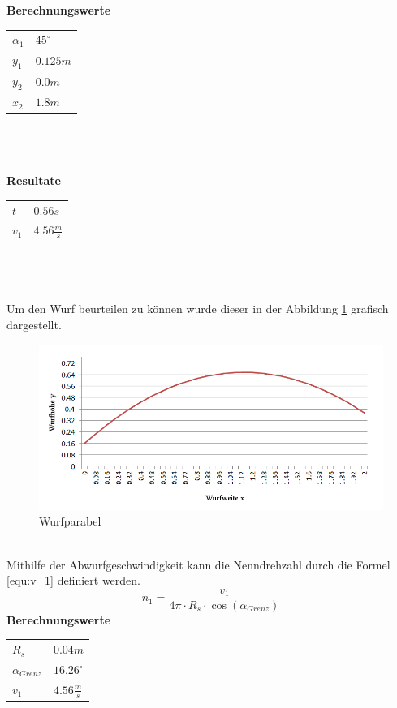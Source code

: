 \newpage
\textbf{Berechnungswerte}\\
\begin{tabular}{ll}
    \rule{0pt}{11pt} $\alpha_1$ & $45^\circ$ \\
    \rule{0pt}{11pt} $y_1$ & $0.125 m$ \\
    \rule{0pt}{11pt} $y_2$ & $0.0 m$ \\
    \rule{0pt}{11pt} $x_2$ & $1.8 m$ \\
\end{tabular}\\
\\
\\
\textbf{Resultate}\\
\begin{tabular}{ll}
    \rule{0pt}{11pt} $t$ & $0.56 s$ \\
    \rule{0pt}{11pt} $v_1$ & $4.56 \frac{m}{s}$ \\
\end{tabular}\\
\\
\\
Um den Wurf beurteilen zu können wurde dieser in der Abbildung \ref{fig:Wurfparabel} 
grafisch dargestellt.
\begin{figure}[h!]
    \centering
    \includegraphics[width=1\textwidth,clip,trim=7mm 7mm 7mm 0mm]
    {Enddokumentation/Anhang/Bilder/Schiefer_Wurf.jpg}
    \caption{Wurfparabel}
    \label{fig:Wurfparabel}
\end{figure}\\
Mithilfe der Abwurfgeschwindigkeit kann die Nenndrehzahl durch die Formel 
\ref{equ:v_1} definiert werden.
\begin{equation}  
    n_1 = \frac{v_1}{4\pi \cdot R_s \cdot \cos(\alpha_{Grenz})}
    \label{equ:v_1}
\end{equation}
\newpage
\textbf{Berechnungswerte}\\
\begin{tabular}{ll}
    \rule{0pt}{11pt} $R_s$ & $0.04 m$ \\
    \rule{0pt}{11pt} $\alpha_{Grenz}$ & $16.26^\circ$ \\
    \rule{0pt}{11pt} $v_1$ & $4.56 \frac{m}{s}$ \\
\end{tabular}\\
